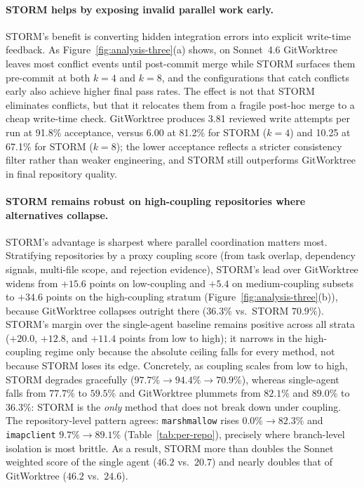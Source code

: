 \documentclass{article}
\begin{document}
\paragraph{STORM helps by exposing invalid parallel work early.}
  STORM's benefit is converting hidden integration errors into explicit write-time feedback. As Figure~\ref{fig:analysis-three}(a) shows, on Sonnet~4.6 GitWorktree leaves most conflict events until post-commit merge while STORM surfaces them pre-commit at both $k{=}4$ and $k{=}8$, and the configurations that catch conflicts early also achieve higher final pass rates. The effect is not that STORM eliminates conflicts, but that it relocates them from a fragile post-hoc merge to a cheap write-time check. GitWorktree produces 3.81 reviewed write attempts per run at 91.8\% acceptance, versus 6.00 at 81.2\% for STORM ($k{=}4$) and 10.25 at 67.1\% for STORM ($k{=}8$); the lower acceptance reflects a stricter consistency filter rather than weaker engineering, and STORM still outperforms GitWorktree in final repository quality.

  \paragraph{STORM remains robust on high-coupling repositories where alternatives collapse.}
  STORM's advantage is sharpest where parallel coordination matters most. Stratifying repositories by a proxy coupling score (from task overlap, dependency signals, multi-file scope, and rejection evidence), STORM's lead over GitWorktree widens from $+15.6$ points on low-coupling and $+5.4$ on medium-coupling subsets to $+34.6$ points on the high-coupling stratum (Figure~\ref{fig:analysis-three}(b)), because GitWorktree collapses outright there ($36.3\%$ vs.\ STORM $70.9\%$). STORM's margin over the single-agent baseline remains positive across all strata ($+20.0$, $+12.8$, and $+11.4$ points from low to high); it narrows in the high-coupling regime only because the absolute ceiling falls for every method, not because STORM loses its edge. Concretely, as coupling scales from low to high, STORM degrades gracefully ($97.7\% \to 94.4\% \to 70.9\%$), whereas single-agent falls from $77.7\%$ to $59.5\%$ and GitWorktree plummets from $82.1\%$ and $89.0\%$ to $36.3\%$: STORM is the \emph{only} method that does not break down under coupling. The repository-level pattern agrees: \texttt{marshmallow} rises $0.0\%\to82.3\%$ and \texttt{imapclient} $9.7\%\to89.1\%$ (Table~\ref{tab:per-repo}), precisely where branch-level isolation is most brittle. As a result, STORM more than doubles the Sonnet weighted score of the single agent ($46.2$ vs.\ $20.7$) and nearly doubles that of GitWorktree ($46.2$ vs.\ $24.6$).
\end{document}
